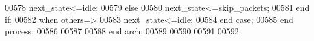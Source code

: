 \begin{DoxyCode}
00578                 \textcolor{vhdlchar}{next_state}\textcolor{vhdlchar}{<=}\textcolor{vhdlchar}{idle};
00579             \textcolor{keywordflow}{else} 
00580                 \textcolor{vhdlchar}{next_state}\textcolor{vhdlchar}{<=}\textcolor{vhdlchar}{skip\_packets};
00581             \textcolor{keywordflow}{end} \textcolor{keywordflow}{if};     
00582         \textcolor{keywordflow}{when} \textcolor{keywordflow}{others}\textcolor{vhdlchar}{=}\textcolor{vhdlchar}{>}
00583             \textcolor{vhdlchar}{next_state}\textcolor{vhdlchar}{<=}\textcolor{vhdlchar}{idle};
00584     \textcolor{keywordflow}{end} \textcolor{keywordflow}{case};
00585 \textcolor{keywordflow}{end} \textcolor{keywordflow}{process};
00586  
00587   
00588 \textcolor{keywordflow}{end} \textcolor{vhdlchar}{arch};   
00589 
00590 
00591 
00592 
\end{DoxyCode}
